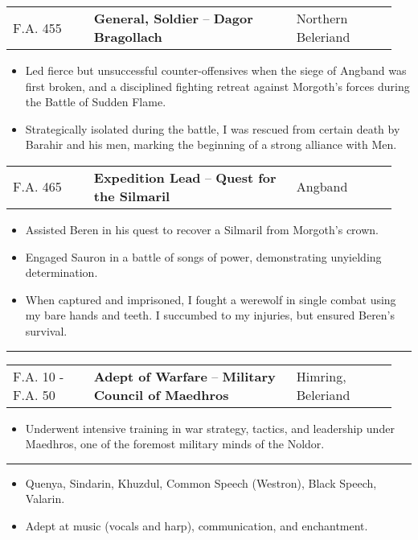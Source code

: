 \documentclass[a4paper, 10pt]{article}
\makeatletter
\newcommand{\sectiontitle}[1]{
    \vspace{8pt}
    \footnotesize
    \noindent{\large \textbf{#1}}
    \vspace{3pt}
    \hrule
    \vspace{6pt}
}
\newcommand{\entry}[4]{
    \vspace{6pt}
    \footnotesize
    \noindent
    \begin{tabular}{@{} p{0.2\linewidth} p{0.5\linewidth} p{0.25\linewidth} @{}}
        {#4} & \textbf{#1} -- \textbf{#2} & \hfill{#3} \\
    \end{tabular}
    \vspace{4pt}
}
\makeatother
\begin{document}
\entry{General, Soldier}{Dagor Bragollach}{Northern Beleriand}{F.A. 455}
\begin{itemize}[left=0.25\linewidth, noitemsep, before=\small]
    \footnotesize
    \item Led fierce but unsuccessful counter-offensives when the siege of Angband was first broken, and a disciplined fighting retreat against Morgoth's forces during the Battle of Sudden Flame.
    \item Strategically isolated during the battle, I was rescued from certain death by Barahir and his men, marking the beginning of a strong alliance with Men.
\end{itemize}

\entry{Expedition Lead}{Quest for the Silmaril}{Angband}{F.A. 465}
\begin{itemize}[left=0.25\linewidth, noitemsep, before=\small]
    \footnotesize
    \item Assisted Beren in his quest to recover a Silmaril from Morgoth's crown.
    \item Engaged Sauron in a battle of songs of power, demonstrating unyielding determination.
    \item When captured and imprisoned, I fought a werewolf in single combat using my bare hands and teeth. I succumbed to my injuries, but ensured Beren's survival.
\end{itemize}


\sectiontitle{Education}

\entry{Adept of Warfare}{Military Council of Maedhros}{Himring, Beleriand}{F.A. 10 - F.A. 50}
\begin{itemize}[left=0.25\linewidth, noitemsep, before=\small]
    \footnotesize
    \item Underwent intensive training in war strategy, tactics, and leadership under Maedhros, one of the foremost military minds of the Noldor.
\end{itemize}

\sectiontitle{Interests}
\begin{itemize}[left=0.25\linewidth, noitemsep]
    \footnotesize
    \item Quenya, Sindarin, Khuzdul, Common Speech (Westron), Black Speech, Valarin.
    \item Adept at music (vocals and harp), communication, and enchantment.
\end{itemize}
\end{document}
